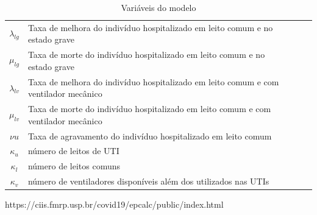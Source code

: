 \documentclass{article}
\begin{document}
\begin{table}[h]
\begin{tabular}{|c|p{7cm}|p{2cm}|l|l}
$\lambda_{lg}$   & Taxa de melhora do indivíduo hospitalizado  em leito comum e no estado grave                             &                           &            &  \\ \cline{1-4}
$\mu_{lg}$   & Taxa de morte do indivíduo hospitalizado  em leito comum e no estado grave                             &                           &            &  \\ \cline{1-4}
$\lambda_{lv}$   & Taxa de melhora do indivíduo hospitalizado  em leito comum e com ventilador mecânico                            &                           &            &  \\ \cline{1-4}

$\mu_{lv}$   & Taxa de morte do indivíduo hospitalizado  em leito comum e com ventilador mecânico                            &                           &            &  \\ \cline{1-4}
$\nu{u}$   & Taxa de agravamento do indivíduo hospitalizado em leito comum                             &                           &            &  \\ \cline{1-4}


$\kappa_u$ & número de leitos de UTI          &      &            &  \\ \cline{1-4}              
$\kappa_l$ & número de leitos comuns          &      &            &  \\ \cline{1-4}              
$\kappa_v$ & número de ventiladores disponíveis  além dos utilizados nas UTIs         &      &            &  \\ \cline{1-4}        
\end{tabular}
\caption{ Variáveis do modelo}
\end{table}

https://ciis.fmrp.usp.br/covid19/epcalc/public/index.html


% 
% 
\end{document}

